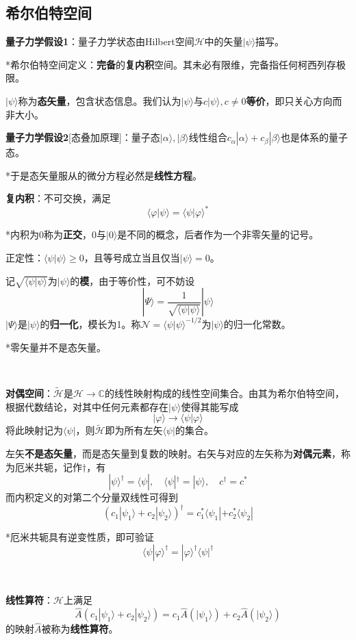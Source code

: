\documentclass[a4paper,UTF8,fontset=windows]{ctexart}
\newcommand*{\ket}[1]{|#1\rangle}
\newcommand*{\bra}[1]{\langle#1|}
\newcommand*{\bk}[2]{\langle#1|#2\rangle}
\begin{document}
\subsection{希尔伯特空间}
\textbf{量子力学假设1}：量子力学状态由Hilbert空间$\mathcal{H}$中的矢量$\ket{\psi}$描写。

*希尔伯特空间定义：\textbf{完备}的\textbf{复内积}空间。其未必有限维，完备指任何柯西列存极限。

$\ket{\psi}$称为\textbf{态矢量}，包含状态信息。我们认为$\ket{\psi}$与$c\ket{\psi},c\ne0$\textbf{等价}，即只关心方向而非大小。

\textbf{量子力学假设2}[态叠加原理]：量子态$\ket{\alpha},\ket{\beta}$线性组合$c_\alpha\ket{\alpha}+c_\beta\ket{\beta}$也是体系的量子态。

*于是态矢量服从的微分方程必然是\textbf{线性方程}。

\textbf{复内积}：不可交换，满足
$$\bk{\varphi}{\psi}=\bk{\psi}{\varphi}^*$$

*内积为0称为\textbf{正交}，0与$\ket{0}$是不同的概念，后者作为一个非零矢量的记号。

正定性：$\bk{\psi}{\psi}\ge0$，且等号成立当且仅当$\ket{\psi}=0$。

记$\sqrt{\bk{\psi}{\psi}}$为$\ket{\psi}$的\textbf{模}，由于等价性，可不妨设
$$\ket{\Psi}=\frac{1}{\sqrt{\bk{\psi}{\psi}}}\ket{\psi}$$
$\ket{\Psi}$是$\ket{\psi}$的\textbf{归一化}，模长为1。称$\mathcal{N}=\bk{\psi}{\psi}^{-1/2}$为$\ket{\psi}$的归一化常数。

*零矢量并不是态矢量。

\

\textbf{对偶空间}：$\tilde{\mathcal{H}}$是$\mathcal{H}\to\mathbb{C}$的线性映射构成的线性空间集合。由其为希尔伯特空间，根据代数结论，对其中任何元素都存在$\ket{\psi}$使得其能写成
$$\ket{\varphi}\to\bk{\psi}{\varphi}$$
将此映射记为$\bra{\psi}$，则$\tilde{\mathcal{H}}$即为所有左矢$\bra{\psi}$的集合。

左矢\textbf{不是态矢量}，而是态矢量到复数的映射。右矢与对应的左矢称为\textbf{对偶元素}，称为厄米共轭，记作$\dagger$，有
$$\ket{\psi}^\dagger=\bra{\psi},\quad\bra{\psi}^\dagger=\ket{\psi},\quad c^\dagger=c^*$$
而内积定义的对第二个分量双线性可得到
$$(c_1\ket{\psi_1}+c_2\ket{\psi_2})^\dagger=c_1^*\bra{\psi_1}+c_2^*\bra{\psi_2}$$

*厄米共轭具有逆变性质，即可验证
$$\bk{\psi}{\varphi}^\dagger=\ket{\varphi}^\dagger\bra{\psi}^\dagger$$

\

\textbf{线性算符}：$\mathcal{H}$上满足
$$\hat{A}(c_1\ket{\psi_1}+c_2\ket{\psi_2})=c_1\hat{A}(\ket{\psi_1})+c_2\hat{A}(\ket{\psi_2})$$
的映射$\hat{A}$被称为\textbf{线性算符}。
\end{document}
